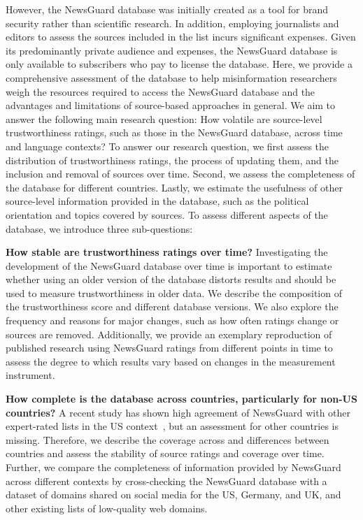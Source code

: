 \documentclass[12pt,twoside]{article}
\begin{document}
However, the NewsGuard database was initially created as a tool for brand security rather than scientific research. 
In addition, employing journalists and editors to assess the sources included in the list incurs significant expenses. 
Given its predominantly private audience and expenses, the NewsGuard database is only available to subscribers who pay to license the database.
Here, we provide a comprehensive assessment of the database to help misinformation researchers weigh the resources required to access the NewsGuard database and the advantages and limitations of source-based approaches in general.
We aim to answer the following main research question: How volatile are source-level trustworthiness ratings, such as those in the NewsGuard database, across time and language contexts?
To answer our research question, we first assess the distribution of trustworthiness ratings, the process of updating them, and the inclusion and removal of sources over time. 
Second, we assess the completeness of the database for different countries. 
Lastly, we estimate the usefulness of other source-level information provided in the database, such as the political orientation and topics covered by sources. To assess different aspects of the database, we introduce three sub-questions:

\textbf{How stable are trustworthiness ratings over time?} 
Investigating the development of the NewsGuard database over time is important to estimate whether using an older version of the database distorts results and should be used to measure trustworthiness in older data. 
We describe the composition of the trustworthiness score and different database versions.
We also explore the frequency and reasons for major changes, such as how often ratings change or sources are removed.
Additionally, we provide an exemplary reproduction of published research using NewsGuard ratings from different points in time to assess the degree to which results vary based on changes in the measurement instrument.

\textbf{How complete is the database across countries, particularly for non-US countries?} 
A recent study has shown high agreement of NewsGuard with other expert-rated lists in the US context~\citep{linHighLevelCorrespondence2023a}, but an assessment for other countries is missing. 
Therefore, we describe the coverage across and differences between countries and assess the stability of source ratings and coverage over time.
Further, we compare the completeness of information provided by NewsGuard across different contexts by cross-checking the NewsGuard database with a dataset of domains shared on social media for the US, Germany, and UK, and other existing lists of low-quality web domains. 
\end{document}
